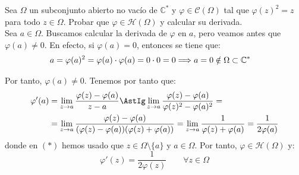\begin{ejercicio}
    Sea $\Omega$ un subconjunto abierto no vacío de $\mathbb{C}^*$ y $\varphi \in \mathcal{C}(\Omega)$ tal que $\varphi(z)^2 = z$ para todo $z \in \Omega$. Probar que $\varphi \in \mathcal{H}(\Omega)$ y calcular su derivada.\\

    Sea $a\in \Omega$. Buscamos calcular la derivada de $\varphi$ en $a$, pero veamos antes que $\varphi(a)\neq 0$. En efecto, si $\varphi(a) = 0$, entonces se tiene que:
    \begin{align*}
        a = \varphi(a)^2 &= \varphi(a)\cdot \varphi(a) = 0\cdot 0 = 0\Longrightarrow a = 0\notin \Omega\subset \mathbb{C}^*
    \end{align*}

    Por tanto, $\varphi(a)\neq 0$. Tenemos por tanto que:
    \begin{align*}
        \varphi'(a) &= \lim_{z\to a}\dfrac{\varphi(z) - \varphi(a)}{z-a} \AstIg \lim_{z\to a}\dfrac{\varphi(z)-\varphi(a)}{\varphi(z)^2 - \varphi(a)^2} =\\&= \lim_{z\to a}\dfrac{\varphi(z)-\varphi(a)}{(\varphi(z) - \varphi(a))(\varphi(z) + \varphi(a))} = \lim_{z\to a}\dfrac{1}{\varphi(z) + \varphi(a)} = \dfrac{1}{2\varphi(a)}
    \end{align*}
    donde en $(\ast)$ hemos usado que $z\in \Omega\setminus \{a\}$ y $a\in \Omega$. Por tanto, $\varphi\in \mathcal{H}(\Omega)$ y:
    \begin{equation*}
        \varphi'(z) = \dfrac{1}{2\varphi(z)}\qquad \forall z\in \Omega
    \end{equation*}
\end{ejercicio}

